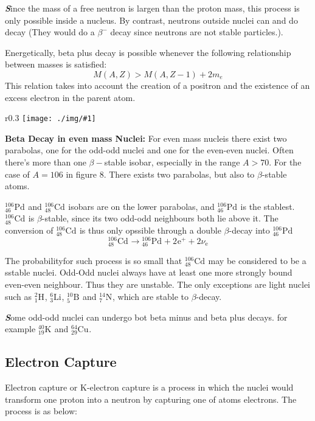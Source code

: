 \documentclass[10pt,a4paper]{article}
\newcounter{figurecounter}
\newcommand{\imgr}[3]{
    \begin{wrapfigure}{r}{#2\textwidth}
        \centering
        \captionsetup{justification=centering,margin=0.5cm,labelformat=empty}
        \texttt{[image: ./img/\#1]}
        \label{figure}
        \caption{\small \textbf{fig: \thefigurecounter} -- \textcolor{darkliver}{#3}}
    \end{wrapfigure}
    \addtocounter{figurecounter}{1}}
\newenvironment{callout}
	{\begin{calloutbox}\color{charcoal}\textbf\textit}
	{\end{calloutbox}}
\newcommand{\ch}[5]{{}^{#2}_{#3}\!\text{#1}^{#4}_{#5}}
\begin{document}
\begin{callout}
    Since the mass of  a free neutron is largen than the proton mass, this process is only possible inside a nucleus. By contrast, neutrons outside nuclei can and do decay (They would do a $\beta^-$ decay since neutrons are not stable particles.).

    Energetically, beta plus decay is possible whenever the following relationship between masses is satisfied:
    $$
    M(A,Z) > M(A, Z-1) + 2m_e
    $$
    This relation takes into account the creation of a positron and the existence of an excess electron in the parent atom.
\end{callout}

\imgr{massparabolaA106}{0.3}{The Mass parabola of $A=106$ which shows two parabola because of even-even and odd-odd parity term.}
\textbf{Beta Decay in even mass Nuclei:} For even mass nucleis there exist two parabolas, one for the odd-odd nuclei and one for the even-even nuclei. Often there's more than one $\beta-$stable isobar, especially in the range $A>70$. For the case of $A=106$ in figure 8. There exists two parabolas, but also to $\beta$-stable atoms.

$\ch{Pd}{106}{46}{}{}$ and $\ch{Cd}{106}{48}{}{}$ isobars are on the lower parabolas, and $\ch{Pd}{106}{46}{}{}$ is the stablest. $\ch{Cd}{106}{48}{}{}$ is $\beta$-stable, since its two odd-odd neighbours both lie above it. The conversion of $\ch{Cd}{106}{48}{}{}$ is thus only opssible through a double $\beta$-decay into $\ch{Pd}{106}{46}{}{}$ 
\begin{equation}
    \ch{Cd}{106}{48}{}{} \rightarrow \ch{Pd}{106}{46}{}{} + 2\ch{e}{}{}{+}{} +2\nu_{\text{e}}
\end{equation}

The probabilityfor such process is so small that $\ch{Cd}{106}{48}{}{}$ may be considered to be a sstable nuclei. Odd-Odd nuclei always have at least one more strongly bound even-even neighbour. Thus they are unstable. The only exceptions are light nuclei such as $\ch{H}{2}{1}{}{}$, $\ch{Li}{6}{3}{}{}$, $\ch{B}{10}{5}{}{}$ and $\ch{N}{14}{7}{}{}$, which are stable to $\beta$-decay.

\begin{callout}
    Some odd-odd nuclei can undergo bot beta minus and beta plus decays. for example $\ch{K}{40}{19}{}{}$ and $\ch{Cu}{64}{29}{}{}$.
\end{callout}
\subsection{Electron Capture}
Electron capture or K-electron capture is a process in which the nuclei would transform one proton into a neutron by capturing one of atoms electrons. The process is as below:
\end{document}
